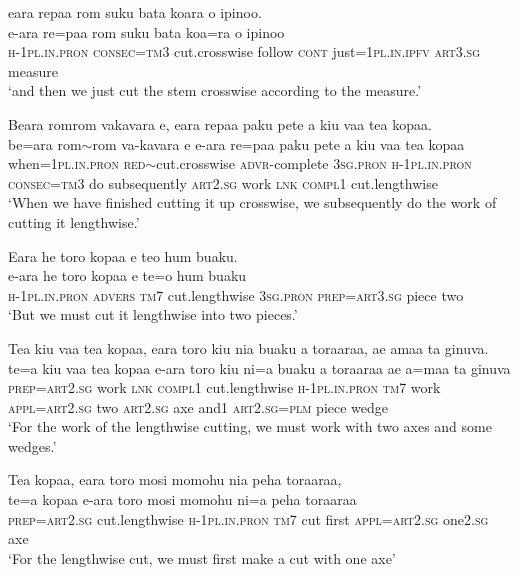 \ea\label{ex:text15-13}
eara repaa rom suku bata koara o ipinoo.\\
\gll e-ara	re=paa	rom	suku	bata	koa=ra	o	ipinoo\\
     \textsc{h}-1\textsc{pl}.\textsc{in}.\textsc{pron}	\textsc{consec}=\textsc{tm}3	cut.crosswise	follow	\textsc{cont}	just=1\textsc{pl}.\textsc{in}.\textsc{ipfv}	\textsc{art}3.\textsc{sg}	measure\\
\glt `and then we just cut the stem crosswise according to the measure.'
\z

\ea\label{ex:text15-14}
Beara romrom vakavara e, eara repaa paku pete a kiu vaa tea kopaa.\\
\gll be=ara	rom{$\sim$}rom	va-kavara	e	e-ara	re=paa	paku	pete	a	kiu	vaa	tea	kopaa\\
     when=1\textsc{pl}.\textsc{in}.\textsc{pron}	\textsc{red}{$\sim$}cut.crosswise	\textsc{advr}-complete	3\textsc{sg}.\textsc{pron}	\textsc{h}-1\textsc{pl}.\textsc{in}.\textsc{pron}	\textsc{consec}=\textsc{tm}3	do	subsequently	\textsc{art}2.\textsc{sg}	work	\textsc{lnk}	\textsc{compl}1	cut.lengthwise\\
\glt `When we have finished cutting it up crosswise, we subsequently do the work of cutting it lengthwise.'
\z

\ea\label{ex:text15-15}
Eara he toro kopaa e teo hum buaku.\\
\gll e-ara	he	toro	kopaa	e	te=o	hum	buaku\\
     \textsc{h}-1\textsc{pl}.\textsc{in}.\textsc{pron}	\textsc{advers}	\textsc{tm}7	cut.lengthwise	3\textsc{sg}.\textsc{pron}	\textsc{prep}=\textsc{art}3.\textsc{sg}	piece	two\\
\glt `But we must cut it lengthwise into two pieces.'
\z

\ea\label{ex:text15-16}
Tea kiu vaa tea kopaa, eara toro kiu nia buaku a toraaraa, ae amaa ta ginuva.\\
\gll te=a	kiu	vaa	tea	kopaa	e-ara	toro	kiu	ni=a	buaku	a	toraaraa	ae	a=maa	ta	ginuva\\
     \textsc{prep}=\textsc{art}2.\textsc{sg}	work	\textsc{lnk}	\textsc{compl}1	cut.lengthwise	\textsc{h}-1\textsc{pl}.\textsc{in}.\textsc{pron}	\textsc{tm}7	work	\textsc{appl}=\textsc{art}2.\textsc{sg}	two	\textsc{art}2.\textsc{sg}	axe	and1	\textsc{art}2.\textsc{sg}=\textsc{plm}	piece	wedge\\
\glt `For the work of the lengthwise cutting, we must work with two axes and some wedges.'
\z

\ea\label{ex:text15-17}
Tea kopaa, eara toro mosi momohu nia peha toraaraa,\\
\gll te=a	kopaa	e-ara	toro	mosi	momohu	ni=a	peha	toraaraa\\
     \textsc{prep}=\textsc{art}2.\textsc{sg}	cut.lengthwise	\textsc{h}-1\textsc{pl}.\textsc{in}.\textsc{pron}	\textsc{tm}7	cut	first	\textsc{appl}=\textsc{art}2.\textsc{sg}	one2.\textsc{sg}	axe\\
\glt `For the lengthwise cut, we must first make a cut with one axe'
\z

